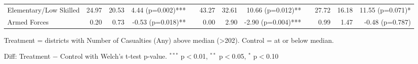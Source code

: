 \begin{table}[htbp]
\begin{tabular}{l rrr c rrr c rrr}
\quad Elementary/Low Skilled & 24.97 & 20.53 & 4.44 (p=0.002)*** &  & 43.27 & 32.61 & 10.66 (p=0.012)** &  & 27.72 & 16.18 & 11.55 (p=0.071)* \\
\quad Armed Forces & 0.20 & 0.73 & -0.53 (p=0.018)** &  & 0.00 & 2.90 & -2.90 (p=0.004)*** &  & 0.99 & 1.47 & -0.48 (p=0.787) \\
\bottomrule
\end{tabular}
\begin{tablenotes}
\small
\item Treatment = districts with Number of Casualties (Any) above median (>202). Control = at or below median.
\item Diff: Treatment $-$ Control with Welch's t-test p-value. $^{{***}}$ p$<$0.01, $^{{**}}$ p$<$0.05, $^{{*}}$ p$<$0.10
\end{tablenotes}
\end{table}

\clearpage

